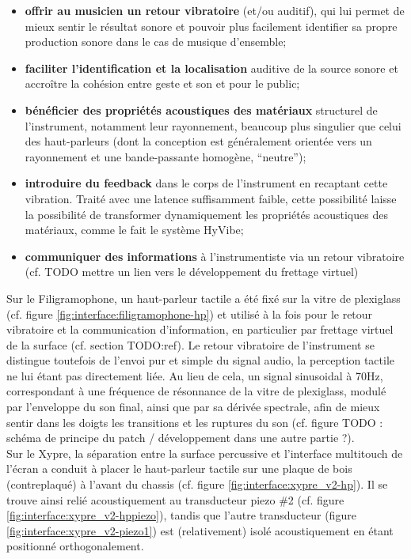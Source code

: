\vspace{-1em}
\begin{itemize}[noitemsep]
	\item \textbf{offrir au musicien un retour vibratoire }(et/ou auditif), qui lui permet de mieux sentir le résultat sonore et pouvoir plus facilement identifier sa propre production sonore dans le cas de musique d'ensemble;
	\item \textbf{faciliter l'identification et la localisation} auditive de la source sonore et accroître la cohésion entre geste et son et pour le public;
	\item \textbf{bénéficier des propriétés acoustiques des matériaux} structurel de l'instrument, notamment leur rayonnement, beaucoup plus singulier que celui des haut-parleurs (dont la conception est généralement orientée vers un rayonnement et une bande-passante homogène, ``neutre'');
	\item \textbf{introduire du feedback} dans le corps de l'instrument en recaptant cette vibration. Traité avec une latence suffisamment faible, cette possibilité laisse la possibilité de transformer dynamiquement les propriétés acoustiques des matériaux, comme le fait le système HyVibe;
	\item \textbf{communiquer des informations} à l'instrumentiste via un retour vibratoire (cf. TODO mettre un lien vers le développement du frettage virtuel)
\end{itemize}

\noindent Sur le Filigramophone, un haut-parleur tactile a été fixé sur la vitre de plexiglass (cf. figure \ref{fig:interface:filigramophone-hp}) et utilisé à la fois pour le retour vibratoire et la communication d'information, en particulier par frettage virtuel de la surface (cf. section TODO:ref). Le retour vibratoire de l'instrument se distingue toutefois de l'envoi pur et simple du signal audio, la perception tactile ne lui étant pas directement liée. Au lieu de cela, un signal sinusoidal à 70Hz, correspondant à une fréquence de résonnance de la vitre de plexiglass, modulé par l'enveloppe du son final, ainsi que par sa dérivée spectrale, afin de mieux sentir dans les doigts les transitions et les ruptures du son (cf. figure TODO : schéma de principe du patch / développement dans une autre partie ?).\\
\indent Sur le Xypre, la séparation entre la surface percussive et l'interface multitouch de l'écran a conduit à placer le haut-parleur tactile sur une plaque de bois (contreplaqué) à l'avant du chassis (cf. figure \ref{fig:interface:xypre_v2-hp}). Il se trouve ainsi relié acoustiquement au transducteur piezo \#2 (cf. figure \ref{fig:interface:xypre_v2-hppiezo}), tandis que l'autre transducteur (figure \ref{fig:interface:xypre_v2-piezo1}) est (relativement) isolé acoustiquement en étant positionné orthogonalement.

